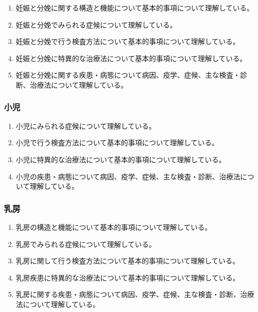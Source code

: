 \begin{enumerate}
\def\labelenumi{\arabic{enumi}.}
\tightlist
\item
  妊娠と分娩に関する構造と機能について基本的事項について理解している。
\item
  妊娠と分娩でみられる症候について理解している。
\item
  妊娠と分娩で行う検査方法について基本的事項について理解している。
\item
  妊娠と分娩に特異的な治療法について基本的事項について理解している。
\item
  妊娠と分娩に関する疾患・病態について病因、疫学、症候、主な検査・診断、治療法について理解している。
\end{enumerate}

\hypertarget{ux5c0fux5150}{%
\subsubsection{小児}\label{ux5c0fux5150}}

\begin{enumerate}
\def\labelenumi{\arabic{enumi}.}
\tightlist
\item
  小児にみられる症候について理解している。
\item
  小児で行う検査方法について基本的事項について理解している。
\item
  小児に特異的な治療法について基本的事項について理解している。
\item
  小児の疾患・病態について病因、疫学、症候、主な検査・診断、治療法について理解している。
\end{enumerate}

\hypertarget{ux4e73ux623f}{%
\subsubsection{乳房}\label{ux4e73ux623f}}

\begin{enumerate}
\def\labelenumi{\arabic{enumi}.}
\tightlist
\item
  乳房の構造と機能について基本的事項について理解している。
\item
  乳房でみられる症候について理解している。
\item
  乳房に関して行う検査方法について基本的事項について理解している。
\item
  乳房疾患に特異的な治療法について基本的事項について理解している。
\item
  乳房に関する疾患・病態について病因、疫学、症候、主な検査・診断、治療法について理解している。
\end{enumerate}

